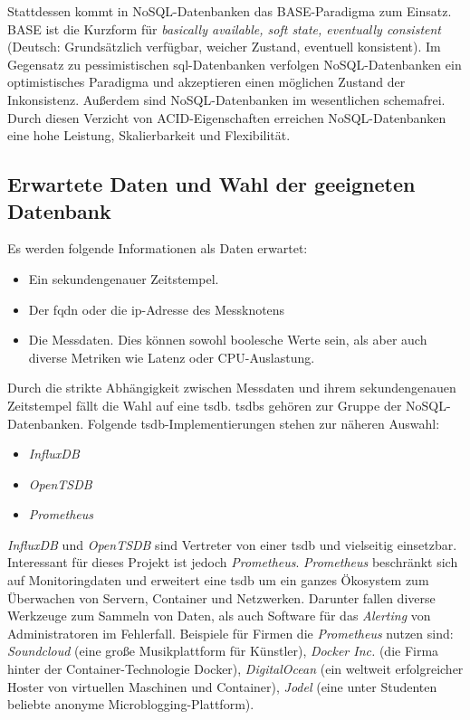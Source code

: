\documentclass[titlepage]{report}
\begin{document}
Stattdessen kommt in NoSQL\hyp{}Datenbanken das BASE\hyp{}Paradigma zum
Einsatz. BASE ist die Kurzform für \emph{basically available, soft
state, eventually consistent} (Deutsch: Grundsätzlich verfügbar, weicher
Zustand, eventuell konsistent). Im Gegensatz zu pessimistischen
\gls{sql}\hyp{}Datenbanken verfolgen NoSQL\hyp{}Datenbanken ein
optimistisches Paradigma\cite[Siehe Seite 51]{BASE} und akzeptieren
einen möglichen Zustand der Inkonsistenz. Außerdem sind NoSQL\hyp{}Datenbanken im
wesentlichen schemafrei\cite{NOSQLKRAMER}. Durch diesen Verzicht von
ACID\hyp{}Eigenschaften erreichen NoSQL\hyp{}Datenbanken eine hohe Leistung,
Skalierbarkeit und Flexibilität\cite[Siehe Seite 11]{NOSQLPERFORMANCE}.
\subsection*{Erwartete Daten und Wahl der geeigneten Datenbank}
Es werden folgende Informationen als Daten erwartet:
\begin{itemize}
    \item Ein sekundengenauer Zeitstempel.
    \item Der \gls{fqdn} oder die \gls{ip}\hyp{}Adresse des Messknotens
    \item Die Messdaten. Dies können sowohl boolesche Werte sein, als
        aber auch diverse Metriken wie Latenz oder CPU\hyp{}Auslastung.
\end{itemize}
Durch die strikte Abhängigkeit zwischen Messdaten und
ihrem sekundengenauen Zeitstempel fällt die Wahl auf eine \gls{tsdb}.
\glspl{tsdb} gehören zur Gruppe der NoSQL\hyp{}Datenbanken.
Folgende \gls{tsdb}\hyp{}Implementierungen stehen zur näheren Auswahl:
\begin{itemize}
    \item \emph{InfluxDB}\cite{INFLUXDB}
    \item \emph{OpenTSDB}\cite{OPENTSDB}
    \item \emph{Prometheus}\cite{PROMETHEUS}
\end{itemize}
\emph{InfluxDB} und \emph{OpenTSDB} sind Vertreter von
einer \gls{tsdb} und vielseitig einsetzbar. Interessant für dieses
Projekt ist jedoch \emph{Prometheus}. \emph{Prometheus} beschränkt sich
auf Monitoringdaten und erweitert eine \gls{tsdb} um ein ganzes
Ökosystem zum Überwachen von Servern, Container und Netzwerken.
Darunter fallen diverse Werkzeuge zum Sammeln von Daten, als auch
Software für das \emph{Alerting} von Administratoren im Fehlerfall.
Beispiele für Firmen die \emph{Prometheus} nutzen sind:
\emph{Soundcloud} (eine große Musikplattform für Künstler), \emph{Docker
Inc.} (die Firma hinter der Container\hyp{}Technologie Docker),
\emph{DigitalOcean} (ein weltweit erfolgreicher Hoster von virtuellen Maschinen
und Container), \emph{Jodel} (eine unter Studenten beliebte anonyme
Microblogging\hyp{}Plattform)\cite{PROMETHEUS}.
\end{document}
